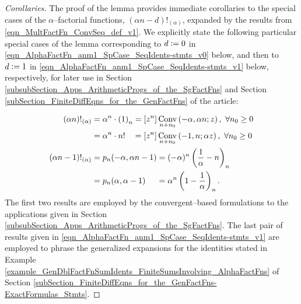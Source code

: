 \documentclass[12pt,reqno]{article}
\renewenvironment{subequations}{%
  \refstepcounter{equation}%
  \edef\theparentequation{\theequation}%
  \setcounter{parentequation}{\value{equation}}%
  \setcounter{equation}{0}%
  \def\theequation{\theparentequation.\alph{equation}}%
  \ignorespaces
}{%
  \setcounter{equation}{\value{parentequation}}%
  \ignorespacesafterend
}
\numberwithin{sfootnote}{section}
\numberwithin{equation}{section}
\theoremstyle{DefaultTheoremStyle}
\theoremstyle{definition}
\newcommand{\defequals}{\ensuremath{\vcentcolon=}}
\newcommand{\StartGroupingSubEquations}{\begin{subequations}}
\newcommand{\EndGroupingSubEquations}{\end{subequations}}
\newcommand{\Pochhammer}[2]{\ensuremath{\left(#1\right)_{#2}}}
\newcommand{\ConvGF}[4]{\ensuremath{\Conv_{#1}\left(#2, #3; #4\right)}}
\DeclareMathOperator{\Conv}{Conv}
\begin{document}
\begin{proof}[Corollaries] 
The proof of the lemma provides immediate corollaries 
to the special cases of the $\alpha$--factorial functions, 
$(\alpha n-d)!_{(\alpha)}$, expanded by the results from 
\eqref{eqn_MultFactFn_ConvSeq_def_v1}. 
We explicitly state the 
following particular special cases of the lemma corresponding to 
$d \defequals 0$ in \eqref{eqn_AlphaFactFn_anm1_SpCase_SeqIdents-stmts_v0} 
below, and then to $d \defequals 1$ in 
\eqref{eqn_AlphaFactFn_anm1_SpCase_SeqIdents-stmts_v1} below, respectively, 
for later use in 
Section \ref{subsubSection_Apps_ArithmeticProgs_of_the_SgFactFns} and 
Section \ref{subSection_FiniteDiffEqns_for_the_GenFactFns} 
of the article: 
\StartGroupingSubEquations 
\begin{align} 
\label{eqn_AlphaFactFn_anm1_SpCase_SeqIdents-stmts_v0} 
(\alpha n)!_{(\alpha)} 
     & = \alpha^{n} \cdot \Pochhammer{1}{n} 
       = [z^n] \ConvGF{n+n_0}{-\alpha}{\alpha n}{z},\ 
       \forall n_0 \geq 0 \\ 
\notag 
    & = \alpha^{n} \cdot n! 
       \phantom{(_{n}} = 
       [z^n] \ConvGF{n+n_0}{-1}{n}{\alpha z},\ 
       \forall n_0 \geq 0 \\ 
\label{eqn_AlphaFactFn_anm1_SpCase_SeqIdents-stmts_v1} 
(\alpha n-1)!_{(\alpha)} & = 
     p_n(-\alpha, \alpha n-1) = 
     (-\alpha)^{n} \Pochhammer{\frac{1}{\alpha}-n}{n} \\ 
\notag 
     & = 
     p_n(\alpha, \alpha - 1) 
     \phantom{-n} = 
     \alpha^{n} \Pochhammer{1-\frac{1}{\alpha}}{n}. 
\end{align} 
\EndGroupingSubEquations 
The first two results are employed by the convergent--based formulations to the 
applications given in 
Section \ref{subsubSection_Apps_ArithmeticProgs_of_the_SgFactFns}. 
The last pair of results given in 
\eqref{eqn_AlphaFactFn_anm1_SpCase_SeqIdents-stmts_v1} 
are employed to phrase the generalized expansions for the identities stated in 
Example \ref{example_GenDblFactFnSumIdents_FiniteSumsInvolving_AlphaFactFns} 
of 
Section \ref{subSection_FiniteDiffEqns_for_the_GenFactFns-ExactFormulas_Stmts}. 
\end{proof} 
\end{document}
